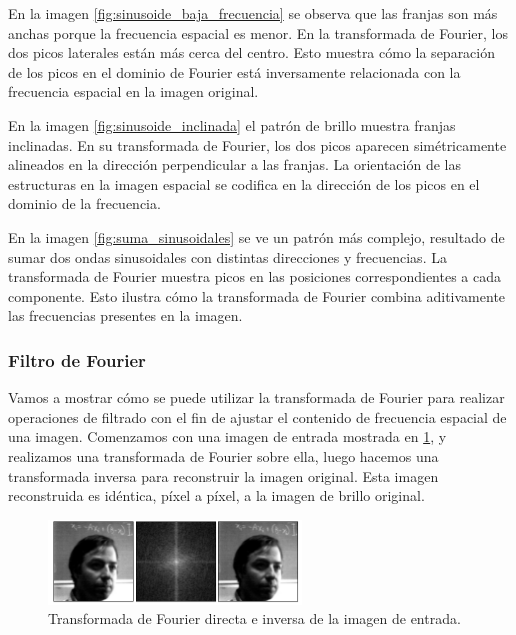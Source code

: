 En la imagen \ref{fig:sinusoide_baja_frecuencia} se observa que las franjas son más anchas porque la frecuencia espacial es menor. En la transformada de Fourier, los dos picos laterales están más cerca del centro. Esto muestra cómo la separación de los picos en el dominio de Fourier está inversamente relacionada con la frecuencia espacial en la imagen original.



En la imagen \ref{fig:sinusoide_inclinada} el patrón de brillo muestra franjas inclinadas. En su transformada de Fourier, los dos picos aparecen simétricamente alineados en la dirección perpendicular a las franjas. La orientación de las estructuras en la imagen espacial se codifica en la dirección de los picos en el dominio de la frecuencia.



En la imagen \ref{fig:suma_sinusoidales} se ve un patrón más complejo, resultado de sumar dos ondas sinusoidales con distintas direcciones y frecuencias. La transformada de Fourier muestra picos en las posiciones correspondientes a cada componente. Esto ilustra cómo la transformada de Fourier combina aditivamente las frecuencias presentes en la imagen.

\subsubsection{Filtro de Fourier}

Vamos a mostrar cómo se puede utilizar la transformada de Fourier para realizar operaciones de filtrado con el fin de ajustar el contenido de frecuencia espacial de una imagen. Comenzamos con una imagen de entrada mostrada en \ref{fig:tranf_inversa_3}, y realizamos una transformada de Fourier sobre ella, luego hacemos una transformada inversa para reconstruir la imagen original. Esta imagen reconstruida es idéntica, píxel a píxel, a la imagen de brillo original.

\begin{figure}[!htbp]
    \centering
    \includegraphics[width=0.6\textwidth]{img/f5.png}
    \caption{Transformada de Fourier directa e inversa de la imagen de entrada. }
    \label{fig:tranf_inversa_3}
\end{figure}




